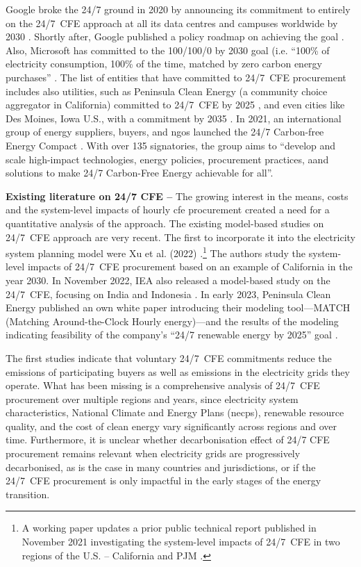 Google broke the 24/7 ground in 2020 by announcing its commitment to entirely on the 24/7~CFE approach at all its data centres and campuses worldwide by 2030 \cite{google-247by2030}.
Shortly after, Google published a policy roadmap on achieving the goal \cite{google-PolicyRoadmap}.
Also, Microsoft has committed to the 100/100/0 by 2030 goal (i.e. \enquote{100\% of electricity consumption, 100\% of the time, matched by zero carbon energy purchases} \cite{Microsoft-vision}. 
The list of entities that have committed to 24/7~CFE procurement includes also utilities, such as Peninsula Clean Energy (a community choice aggregator in California) committed to 24/7~CFE by 2025 \cite{peninsula-OurPathto247}, and even cities like Des Moines, Iowa U.S., with a commitment by 2035 \cite{iowaenvcouncil-247}. In 2021, an international group of energy suppliers, buyers, and \gls{ngo}s launched the 24/7 Carbon-free Energy Compact \cite{gocarbonfree247}.
With over 135 signatories, the group aims to \enquote{develop and scale high-impact technologies, energy policies, procurement practices, aand solutions to make 24/7 Carbon-Free Energy achievable for all}.


\textbf{Existing literature on 24/7 CFE --} The growing interest in the means, costs and the system-level impacts of hourly \gls{cfe} procurement created a need for a quantitative analysis of the approach.
The existing model-based studies on 24/7~CFE approach are very recent.
The first to incorporate it into the electricity system planning model were Xu et al. (2022) \cite{xu-247CFE-SSRN}.\footnote{A working paper updates a prior public technical report published in November 2021 investigating the system-level impacts of 24/7~CFE in two regions of the U.S. -- California and PJM \cite{xu-247CFE-report}.} 
The authors study the system-level impacts of 24/7~CFE procurement based on an example of California in the year 2030.
In November 2022, IEA also released a model-based study on the 24/7~CFE, focusing on India and Indonesia \cite{ieaAdvancingDecarbonisationClean2022}.
In early 2023, Peninsula Clean Energy published an own white paper introducing their modeling tool---MATCH (Matching Around-the-Clock Hourly energy)---and the results of the modeling indicating feasibility of the company's \enquote{24/7 renewable energy by 2025} goal \cite{peninsula-report247}.

The first studies indicate that voluntary 24/7~CFE commitments reduce the emissions of participating buyers as well as emissions in the electricity grids they operate.
What has been missing is a comprehensive analysis of 24/7~CFE procurement over multiple regions and years, since electricity system characteristics, National Climate and Energy Plans (\gls{necp}s), renewable resource quality, and the cost of clean energy vary significantly across regions and over time.
Furthermore, it is unclear whether decarbonisation effect of 24/7 CFE procurement remains relevant when electricity grids are progressively decarbonised, as is the case in many countries and jurisdictions, or if the 24/7~CFE procurement is only impactful in the early stages of the energy transition.

